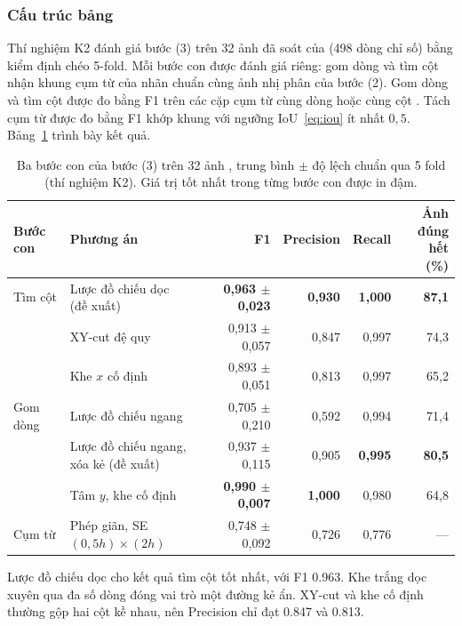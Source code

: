 \subsubsection{Cấu trúc bảng}
Thí nghiệm K2 đánh giá bước (3) trên 32 ảnh đã soát của  (498 dòng chỉ số) bằng kiểm định chéo 5-fold.
Mỗi bước con được đánh giá riêng: gom dòng và tìm cột nhận khung cụm từ của nhãn chuẩn cùng ảnh nhị phân của bước (2).
Gom dòng và tìm cột được đo bằng F1 trên các cặp cụm từ cùng dòng hoặc cùng cột .
Tách cụm từ được đo bằng F1 khớp khung với ngưỡng IoU~\eqref{eq:iou} ít nhất $0{,}5$.
Bảng~\ref{tab:K2} trình bày kết quả.

\begin{table}[H]
\centering
\caption{Ba bước con của bước (3) trên 32 ảnh , trung bình $\pm$ độ lệch chuẩn qua 5 fold (thí nghiệm K2).
Giá trị tốt nhất trong từng bước con được in đậm.}\label{tab:K2}
\small
\begin{tabular}{llrrrr}
\toprule
\textbf{Bước con} & \textbf{Phương án} & \textbf{F1} & \textbf{Precision} & \textbf{Recall} & \makecell[r]{\textbf{Ảnh đúng}\\\textbf{hết (\%)}} \\
\midrule
Tìm cột & \makecell[l]{Lược đồ chiếu dọc\\(đề xuất)} & \textbf{0,963 $\pm$ 0,023} & \textbf{0,930} & \textbf{1,000} & \textbf{87,1} \\
        & XY-cut đệ quy & 0,913 $\pm$ 0,057 & 0,847 & 0,997 & 74,3 \\
        & Khe $x$ cố định & 0,893 $\pm$ 0,051 & 0,813 & 0,997 & 65,2 \\
\midrule
Gom dòng & Lược đồ chiếu ngang & 0,705 $\pm$ 0,210 & 0,592 & 0,994 & 71,4 \\
         & \makecell[l]{Lược đồ chiếu ngang,\\xóa kẻ (đề xuất)} & 0,937 $\pm$ 0,115 & 0,905 & \textbf{0,995} & \textbf{80,5} \\
         & Tâm $y$, khe cố định & \textbf{0,990 $\pm$ 0,007} & \textbf{1,000} & 0,980 & 64,8 \\
\midrule
Cụm từ & Phép giãn, SE $(0{,}5h)\times(2h)$ & 0,748 $\pm$ 0,092 & 0,726 & 0,776 & --- \\
\bottomrule
\end{tabular}
\end{table}

Lược đồ chiếu dọc cho kết quả tìm cột tốt nhất, với F1 \num{0.963}.
Khe trắng dọc xuyên qua đa số dòng đóng vai trò một đường kẻ ẩn.
XY-cut và khe cố định thường gộp hai cột kề nhau, nên Precision chỉ đạt \num{0.847} và \num{0.813}.


